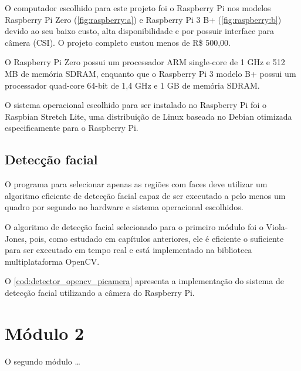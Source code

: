 O computador escolhido para este projeto foi o Raspberry Pi nos modelos Raspberry Pi Zero (\autoref{fig:raspberry:a}) e Raspberry Pi 3 B+ (\autoref{fig:raspberry:b}) devido ao seu baixo custo, alta disponibilidade e por possuir interface para câmera (CSI). O projeto completo custou menos de R\$ 500,00.

O Raspberry Pi Zero possui um processador ARM single-core de 1 GHz e 512 MB de memória SDRAM, enquanto que o Raspberry Pi 3 modelo B+ possui um processador quad-core 64-bit de 1,4 GHz e 1 GB de memória SDRAM.

O sistema operacional escolhido para ser instalado no Raspberry Pi foi o Raspbian Stretch Lite, uma distribuição de Linux baseada no Debian otimizada especificamente para o Raspberry Pi.

\subsection{Detecção facial}

O programa para selecionar apenas as regiões com faces deve utilizar um algoritmo eficiente de detecção facial capaz de ser executado a pelo menos um quadro por segundo no hardware e sistema operacional escolhidos.

O algoritmo de detecção facial selecionado para o primeiro módulo foi o Viola-Jones, pois, como estudado em capítulos anteriores, ele é eficiente o suficiente para ser executado em tempo real e está implementado na biblioteca multiplataforma OpenCV.

O \autoref{cod:detector_opencv_picamera} apresenta a implementação do sistema de detecção facial utilizando a câmera do Raspberry Pi.

\section{Módulo 2}\label{sec:modulo2}

O segundo módulo \ldots